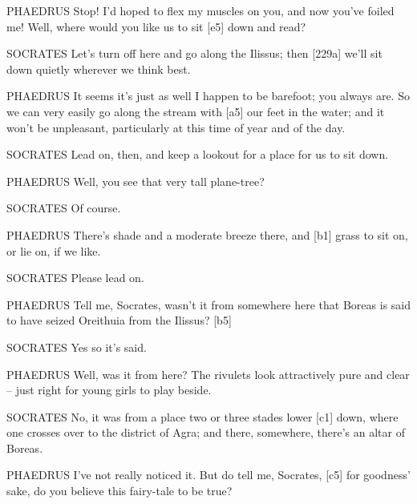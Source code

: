 PHAEDRUS Stop! I'd hoped to flex my muscles on you, and now you've
foiled me! Well, where
would you like us to sit {[}e5{]} down and read?

SOCRATES Let's turn off here and go along the
Ilissus; then {[}229a{]}
we'll sit down quietly wherever we think best.

PHAEDRUS It seems it's just as well I happen to be barefoot; you always
are. So we can very easily go along the stream with {[}a5{]} our feet in
the water; and it won't be unpleasant, particularly at this time of year
and of the day.

SOCRATES Lead on, then, and keep a lookout for a place for us to sit
down.

PHAEDRUS Well, you see that very tall plane-tree?

SOCRATES Of course.

PHAEDRUS There's shade and a moderate breeze there, and {[}b1{]} grass
to sit on, or lie on, if we like.

SOCRATES Please lead on.

PHAEDRUS Tell me, Socrates, wasn't it from somewhere here that Boreas is
said to have seized
Oreithuia from the
Ilissus? {[}b5{]}

SOCRATES Yes so it's said.

PHAEDRUS Well, was it from here? The rivulets look attractively pure and
clear -- just right for young girls to play beside.

SOCRATES No, it was from a place two or three stades lower {[}c1{]}
down, where one crosses over to the district of
Agra; and there,
somewhere, there's an altar of Boreas.

PHAEDRUS I've not really noticed it. But do tell me, Socrates, {[}c5{]}
for goodness' sake, do
you believe this fairy-tale to be true?

